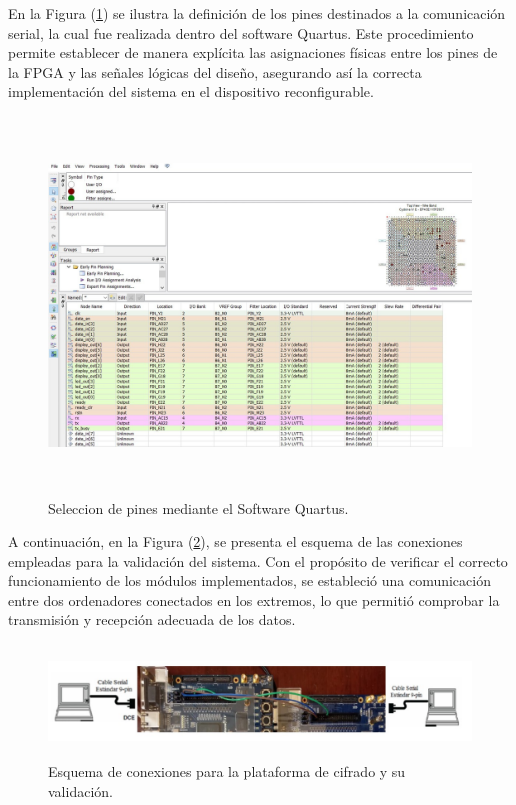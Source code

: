 \clearpage
En la Figura (\ref{fig:imagen14}) se ilustra la definición de los pines destinados a la comunicación serial, la cual fue realizada dentro del software Quartus. Este procedimiento permite establecer de manera explícita las asignaciones físicas entre los pines de la FPGA y las señales lógicas del diseño, asegurando así la correcta implementación del sistema en el dispositivo reconfigurable. 

\begin{figure}[h!] %
    \centering %
     \includegraphics[width=1\textwidth, height=10cm]{imagenes/img14} %
    \caption{  Seleccion de pines mediante el Software Quartus.}
    \label{fig:imagen14} %
\end{figure} 

\clearpage
A continuación, en la Figura (\ref{fig:imagen15}), se presenta el esquema de las conexiones empleadas para la validación del sistema. Con el propósito de verificar el correcto funcionamiento de los módulos implementados, se estableció una comunicación entre dos ordenadores conectados en los extremos, lo que permitió comprobar la transmisión y recepción adecuada de los datos.

\begin{figure}[h!] %
    \centering %
     \includegraphics[width=1\textwidth, height=3cm]{imagenes/img15} %
    \caption{ Esquema de conexiones para la plataforma de cifrado y su validación.}
    \label{fig:imagen15} %
\end{figure} 

